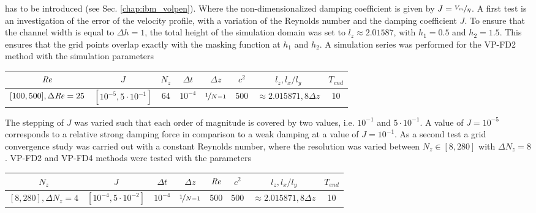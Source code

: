 has to be introduced (see Sec. \ref{chap:ibm_volpen}).
Where the non-dimensionalized damping coefficient is given by $J = \nicefrac{V_{m}}{\eta}$.
A first test is an investigation of the error of the velocity profile, with a variation of the Reynolds number and the damping coefficient $J$.
To ensure that the channel width is equal to $\Delta h = 1$, the total height of the simulation domain was set to $l_z\approx2.01587$,
with $h_1=0.5$ and $h_2=1.5$.
This ensures that the grid points overlap exactly with the masking function at $h_1$ and $h_2$.
A simulation series was performed for the VP-FD2 method with the simulation parameters

\begin{center}
\vspace*{0.5ex}
\begin{tabular}{c|c|c|c|c|c|c|c }
 $ \mbox{\textit{Re}}  $                      & $J$ & $N_z$ &  $\Delta t$ & $\Delta z$            & $c^2$   & $l_z, l_x/l_y$ & $T_{end}$\\
\hline
 $[100, 500], \Delta \mbox{\textit{Re}} = 25 $& $[10^{-5}, 5\cdot10^{-1}]  $ & 64 &  $10^{-4}$ & $\nicefrac{1}{N - 1}$   & $500$   & $\approx{2.015871}, 8\Delta z$ & 10\\
\end{tabular}
\vspace*{0.5ex}
\end{center}

The stepping of $J$ was varied such that each order of magnitude is covered by two values, i.e. $10^{-1}$ and $5\cdot10^{-1}$.
A value of $J=10^{-5}$ corresponds to a relative strong damping force in comparison to a weak damping at a value of $J=10^{-1}$.
As a second test a grid convergence study was carried out with a constant Reynolds number,
where the resolution was varied between $N_z\in [8, 280]$ with $\Delta N_z = 8$. VP-FD2 and VP-FD4 methods were tested with the parameters

\begin{center}
\vspace*{0.5ex}
\begin{tabular}{c|c|c|c|c|c|c|c }
 $ N_z  $                      & $J$ &  $\Delta t$ & $\Delta z$            & $\mbox{\textit{Re}}$  & $c^2$   & $l_z, l_x/l_y$ & $T_{end}$\\
\hline
 $[8, 280], \Delta N_z = 4 $& $[10^{-4}, 5\cdot10^{-2}]  $ &  $10^{-4}$ & $\nicefrac{1}{N - 1}$ & 500     & $500$   & $\approx{2.015871}, 8\Delta z$  & 10\\
\end{tabular}
\vspace*{0.5ex}
\end{center}

